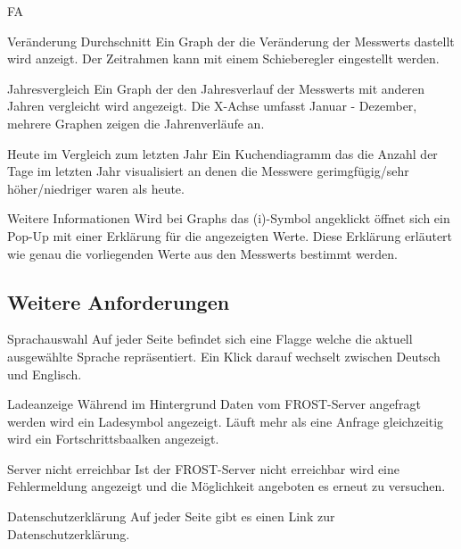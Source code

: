 \begin{Kriterien}{FA}
 \item[Veränderung Durchschnitt]
   Ein Graph der die Veränderung der \glspl{Messwert} dastellt wird anzeigt.
   Der Zeitrahmen kann mit einem Schieberegler eingestellt werden.

 \item[Jahresvergleich]
   Ein Graph der den Jahresverlauf der \glspl{Messwert} mit anderen Jahren vergleicht wird angezeigt.
   Die X-Achse umfasst Januar - Dezember, mehrere Graphen zeigen die Jahrenverläufe an.

 \item[Heute im Vergleich zum letzten Jahr]
   Ein \gls{Kuchendiagramm} das die Anzahl der Tage im letzten Jahr visualisiert an denen die Messwere gerimgfügig/sehr höher/niedriger waren als heute.

 \item[Weitere Informationen]
   Wird bei \glspl{Graph} das (i)-Symbol angeklickt öffnet sich ein \gls{Pop-Up} mit einer Erklärung für die angezeigten Werte.
   Diese Erklärung erläutert wie genau die vorliegenden Werte aus den \glspl{Messwert} bestimmt werden.

\subsection{Weitere Anforderungen}

 \item[Sprachauswahl]
   Auf jeder Seite befindet sich eine Flagge welche die aktuell ausgewählte Sprache repräsentiert.
   Ein Klick darauf wechselt zwischen Deutsch und Englisch.

 \item[Ladeanzeige]
  Während im Hintergrund Daten vom \gls{FROST-Server} angefragt werden wird ein Ladesymbol angezeigt.
  Läuft mehr als eine Anfrage gleichzeitig wird ein Fortschrittsbaalken angezeigt.

 \item[Server nicht erreichbar]
  Ist der \gls{FROST-Server} nicht erreichbar wird eine Fehlermeldung angezeigt und die Möglichkeit angeboten es erneut zu versuchen.

 \item[Datenschutzerklärung]
  Auf jeder Seite gibt es einen Link zur Datenschutzerklärung.


\end{Kriterien}
